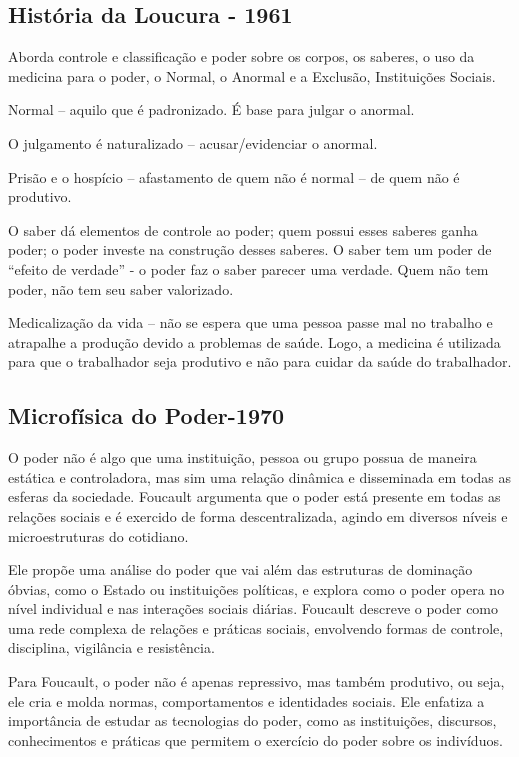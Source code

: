 \documentclass{article}
\begin{document}
\begin{multicols}{2}
\subsection*{História da Loucura - 1961}
Aborda  controle e classificação e poder sobre os corpos, os 
saberes, o uso da medicina para o poder, o Normal, o Anormal e a 
Exclusão, Instituições Sociais. 
 
 Normal – aquilo que é padronizado. É base para julgar o anormal. 
 
 O julgamento é naturalizado – acusar/evidenciar o anormal. 

 Prisão e o hospício – afastamento de quem não é normal – de 
quem não é produtivo. 


O saber dá 
elementos de controle ao poder; quem possui esses saberes ganha 
poder; o poder investe na construção desses saberes. O saber tem 
um poder de “efeito de verdade” - o poder faz o saber parecer uma 
verdade. Quem não tem poder, não tem seu saber valorizado. 

 Medicalização da vida – não se espera que uma pessoa passe 
mal no trabalho e atrapalhe a produção devido a problemas de 
saúde. Logo, a medicina é utilizada para que o trabalhador seja 
produtivo e não para cuidar da saúde do trabalhador.


\subsection*{Microfísica do Poder-1970}
O poder não é algo que uma instituição, pessoa ou grupo possua de maneira estática e controladora, mas sim uma relação dinâmica e disseminada em todas as esferas da sociedade. Foucault argumenta que o poder está presente em todas as relações sociais e é exercido de forma descentralizada, agindo em diversos níveis e microestruturas do cotidiano.

Ele propõe uma análise do poder que vai além das estruturas de dominação óbvias, como o Estado ou instituições políticas, e explora como o poder opera no nível individual e nas interações sociais diárias. Foucault descreve o poder como uma rede complexa de relações e práticas sociais, envolvendo formas de controle, disciplina, vigilância e resistência.

Para Foucault, o poder não é apenas repressivo, mas também produtivo, ou seja, ele cria e molda normas, comportamentos e identidades sociais. Ele enfatiza a importância de estudar as tecnologias do poder, como as instituições, discursos, conhecimentos e práticas que permitem o exercício do poder sobre os indivíduos.


\end{multicols}
\end{document}
